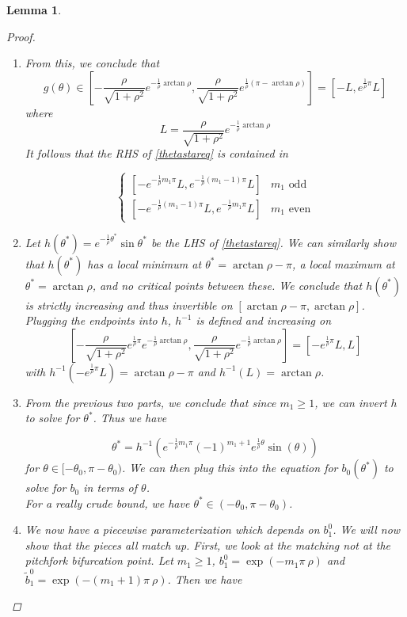 \documentclass[12pt]{article}
\newtheorem{lemma}{Lemma}
\begin{document}
\begin{lemma}
\begin{proof}
\begin{enumerate}
\begin{enumerate}
		\item From this, we conclude that 
		\[
		g(\theta) \in \left[ -\frac{\rho}{\sqrt{1+\rho^2}}e^{-\frac{1}{\rho}\arctan \rho}, \frac{\rho}{\sqrt{1+\rho^2}}e^{\frac{1}{\rho}(\pi - \arctan \rho)}\right] = [-L, e^{\frac{1}{\rho}\pi} L]
		\]
		where 
		\[
		L = \frac{\rho}{\sqrt{1+\rho^2}}e^{-\frac{1}{\rho}\arctan \rho}
		\]
		It follows that the RHS of \eqref{thetastareq} is contained in 

		\[
		\begin{cases}
		[-e^{-\frac{1}{\rho}m_1 \pi} L, e^{-\frac{1}{\rho}(m_1 - 1) \pi} L] & m_1 \text{ odd}\\
		[-e^{-\frac{1}{\rho}(m_1 - 1) \pi} L, e^{-\frac{1}{\rho}m_1 \pi} L] & m_1 \text{ even}
		\end{cases}
		\]

		\item Let $h(\theta^*) = e^{ -\frac{1}{\rho}\theta^* }\sin{\theta^*}$ be the LHS of \eqref{thetastareq}. We can similarly show that $h(\theta^*)$ has a local minimum at $\theta^* = \arctan{\rho} - \pi$, a local maximum at $\theta^* = \arctan{\rho}$, and no critical points between these. We conclude that $h(\theta^*)$ is strictly increasing and thus invertible on $[\arctan{\rho} - \pi, \arctan{\rho}]$. Plugging the endpoints into $h$, $h^{-1}$ is defined and increasing on 
		\[
		\left[ -\frac{\rho}{\sqrt{1+\rho^2}}e^{\frac{1}{\rho}\pi}e^{-\frac{1}{\rho}\arctan \rho}, \frac{\rho}{\sqrt{1+\rho^2}}e^{-\frac{1}{\rho}\arctan \rho}\right] = [-e^{\frac{1}{\rho}\pi} L , L]
		\] 
		with $h^{-1}(-e^{\frac{1}{\rho}\pi} L) = \arctan{\rho} - \pi$ and $h^{-1}(L) = \arctan \rho$. 

		\item From the previous two parts, we conclude that since $m_1 \geq 1$, we can invert $h$ to solve for $\theta^*$. Thus we have

		\[
		\theta^* = h^{-1}\left( e^{ -\frac{1}{\rho} m_1 \pi } (-1)^{m_1 + 1}  e^{ \frac{1}{\rho} \theta } \sin(\theta) \right)
		\]
		for $\theta \in [-\theta_0,\pi - \theta_0)$. We can then plug this into the equation for $b_0(\theta^*)$ to solve for $b_0$ in terms of $\theta$.\\

		For a really crude bound, we have $\theta^* \in (-\theta_0, \pi - \theta_0)$. 

		\item We now have a piecewise parameterization which depends on $b_1^0$. We will now show that the pieces all match up. First, we look at the matching not at the pitchfork bifurcation point. Let $m_1 \geq 1$, $b_1^0 = \exp(-m_1 \pi \ \rho )$ and $\tilde{b}_1^0 = \exp(-(m_1+1) \pi \ \rho )$. Then we have


\end{enumerate}
\end{enumerate}
\end{proof}
\end{lemma}
\end{document}
